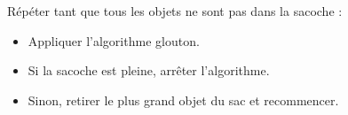 Répéter tant que tous les objets ne sont pas dans la sacoche :
\begin{itemize}
  \item Appliquer l'algorithme glouton.
  \item Si la sacoche est pleine, arrêter l'algorithme.
  \item Sinon, retirer le plus grand objet du sac et recommencer.
\end{itemize}
